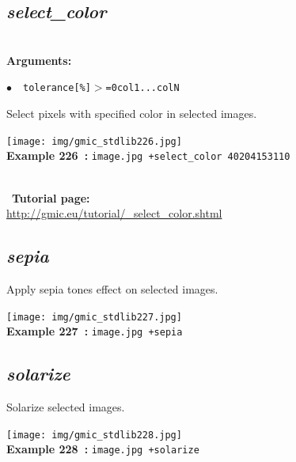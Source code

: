 \documentclass[a4paper,10.5pt,twoside]{book}
\def\comma{\discretionary{,}{}{,}}
\newcommand{\Cb}[1]{\textcolor{cb}{#1}}
\begin{document}
\subsection{\emph{select\_color} }\vspace*{-0.7em}
~\\\textbf{\Cb{Arguments: }}\begin{flushleft}
{\small \Cb{\hspace*{0.5cm}$\bullet$~~\texttt{tolerance[\%]$>$=0{\comma}col1{\comma}...{\comma}colN}}}\end{flushleft}
Select pixels with specified color in selected images.
\begin{center}\texttt{[image: img/gmic\_stdlib226.jpg]}\\
{\footnotesize \textbf{Example 226~:} \texttt{image.jpg +select\_color 40{\comma}204{\comma}153{\comma}110}}
\end{center}
~\\
~\textbf{Tutorial page: }\\\url{http://gmic.eu/tutorial/\_select\_color.shtml}


\subsection{\emph{sepia} }\vspace*{-0.7em}
Apply sepia tones effect on selected images.
\begin{center}\texttt{[image: img/gmic\_stdlib227.jpg]}\\
{\footnotesize \textbf{Example 227~:} \texttt{image.jpg +sepia}}
\end{center}

\subsection{\emph{solarize} }\vspace*{-0.7em}
Solarize selected images.
\begin{center}\texttt{[image: img/gmic\_stdlib228.jpg]}\\
{\footnotesize \textbf{Example 228~:} \texttt{image.jpg +solarize}}
\end{center}
\end{document}

